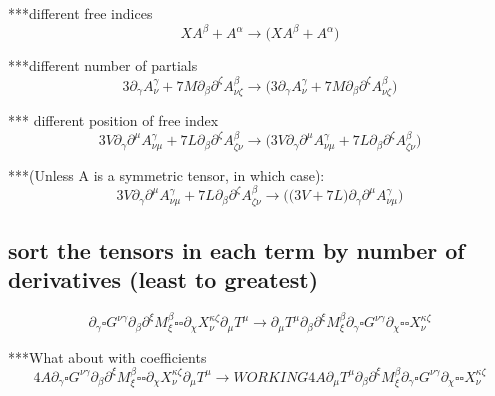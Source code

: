 \documentclass{article}
\def\){\Big)}
\def\({\Big(}
\begin{document}
***different free indices
\begin{equation}
XA^{\beta} + A^{\alpha} \rightarrow 
\(X A^{\beta} + A^{\alpha} \)
\end{equation}

***different number of partials
\begin{equation}
3\partial_{\gamma}A^{\gamma}_{\nu} + 7M \partial_{\beta}\partial^{\zeta}A^{\beta}_{\nu \zeta} \rightarrow 
\(3 \partial_{\gamma}A_{\nu}^{\gamma} +7M \partial_{\beta}\partial^{\zeta}A_{\nu \zeta}^{\beta} \)
\end{equation}

*** different position of free index
\begin{equation}
3V\partial_{\gamma}\partial^{\mu}A^{\gamma}_{\nu \mu} + 7L \partial_{\beta}\partial^{\zeta}A^{\beta}_{\zeta \nu} \rightarrow 
\(3V \partial_{\gamma}\partial^{\mu}A_{\nu \mu}^{\gamma} +7L \partial_{\beta}\partial^{\zeta}A_{\zeta \nu}^{\beta} \)
\end{equation}

***(Unless A is a symmetric tensor, in which case):
\begin{equation}
3V\partial_{\gamma}\partial^{\mu}A^{\gamma}_{\nu \mu} + 7L \partial_{\beta}\partial^{\zeta}A^{\beta}_{\zeta \nu} \rightarrow 
\(\(3V+7L\) \partial_{\gamma}\partial^{\mu}A_{\nu \mu}^{\gamma} \)
\end{equation}


 \subsection{sort the tensors in each term by number of derivatives (least to greatest)}

\begin{equation}
\partial_{\gamma} \square G^{\nu \gamma} \partial_{\beta}\partial^{\xi} M^{\beta}_{\xi}   \square \square \partial_{\chi} X^{\kappa \zeta}_{\nu}  \partial_{\mu}T^{\mu} \rightarrow 
\partial_{\mu}T^{\mu} \partial_{\beta}\partial^{\xi}M_{\xi}^{\beta} \partial_{\gamma}\square G^{\nu \gamma} \partial_{\chi}\square \square X_{\nu}^{\kappa \zeta}
\end{equation}


***What about with coefficients
\begin{equation}
4A\partial_{\gamma} \square G^{\nu \gamma} \partial_{\beta}\partial^{\xi} M^{\beta}_{\xi}   \square \square \partial_{\chi} X^{\kappa \zeta}_{\nu}  \partial_{\mu}T^{\mu} \rightarrow WORKING
4 A \partial_{\mu}T^{\mu} \partial_{\beta}\partial^{\xi}M_{\xi}^{\beta} \partial_{\gamma}\square G^{\nu \gamma} \partial_{\chi}\square \square X_{\nu}^{\kappa \zeta}
\end{equation}
\end{document}
